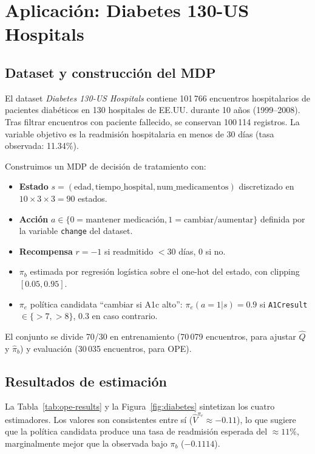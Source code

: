 \documentclass[11pt,a4paper]{article}
\theoremstyle{mitheorem}
\theoremstyle{mitdef}
\begin{document}
\section{Aplicación: Diabetes 130-US Hospitals}
\label{sec:app}

\subsection{Dataset y construcción del MDP}

El dataset \textit{Diabetes 130-US Hospitals} \cite{strack2014impact}
contiene 101\,766 encuentros hospitalarios de pacientes diabéticos
en 130 hospitales de EE.UU. durante 10 años (1999--2008). Tras
filtrar encuentros con paciente fallecido, se conservan 100\,114
registros. La variable objetivo es la readmisión hospitalaria en
menos de 30 días (tasa observada: 11.34\%).

Construimos un MDP de decisión de tratamiento con:
\begin{itemize}
  \item \textbf{Estado} $s = (\text{edad}, \text{tiempo\_hospital}, \text{num\_medicamentos})$
        discretizado en $10\times 3\times 3 = 90$ estados.
  \item \textbf{Acción} $a\in\{0=\text{mantener medicación}, 1=\text{cambiar/aumentar}\}$
        definida por la variable \texttt{change} del dataset.
  \item \textbf{Recompensa} $r = -1$ si readmitido $<30$ días, $0$ si no.
  \item \textbf{$\pi_b$} estimada por regresión logística sobre el
        one-hot del estado, con clipping $[0.05, 0.95]$.
  \item \textbf{$\pi_e$} política candidata ``cambiar si A1c alto'':
        $\pi_e(a=1|s) = 0.9$ si \texttt{A1Cresult}$\in\{>7,>8\}$,
        $0.3$ en caso contrario.
\end{itemize}

El conjunto se divide 70/30 en entrenamiento (70\,079 encuentros,
para ajustar $\hat Q$ y $\hat\pi_b$) y evaluación (30\,035
encuentros, para OPE).

\subsection{Resultados de estimación}

La Tabla~\ref{tab:ope-results} y la Figura~\ref{fig:diabetes}
sintetizan los cuatro estimadores. Los valores son consistentes entre
sí ($\hat V^{\pi_e}\approx -0.11$), lo que sugiere que la política
candidata produce una tasa de readmisión esperada del $\approx 11\%$,
marginalmente mejor que la observada bajo $\pi_b$ ($-0.1114$).
\end{document}
